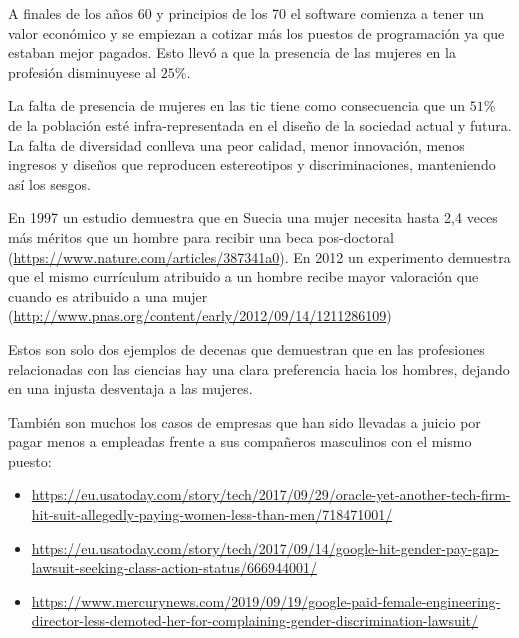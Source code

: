 A finales de los años 60 y principios de los 70 el software comienza a tener un valor económico y se empiezan a cotizar más los puestos de programación ya que estaban mejor pagados. Esto llevó a que la presencia de las mujeres en la profesión disminuyese al $25\%$.

La falta de presencia de mujeres en las \gls{tic}  tiene como consecuencia que un $51\%$ de la población esté infra-representada en el diseño de la sociedad actual y futura. La falta de diversidad conlleva una peor calidad, menor innovación, menos ingresos y diseños que reproducen estereotipos y discriminaciones, manteniendo así los sesgos.

En 1997 un estudio demuestra que en Suecia una mujer necesita hasta 2,4 veces más méritos que un hombre para recibir una beca pos-doctoral (\url{https://www.nature.com/articles/387341a0}). En 2012 un experimento demuestra que el mismo currículum atribuido a un hombre recibe mayor valoración que cuando es atribuido a una mujer  (\url{http://www.pnas.org/content/early/2012/09/14/1211286109})

Estos son solo dos ejemplos de decenas que demuestran que en las profesiones relacionadas con las ciencias hay una clara preferencia hacia los hombres, dejando en una injusta desventaja a las mujeres.

También son muchos los casos de empresas que han sido llevadas a juicio por pagar menos a empleadas frente a sus compañeros masculinos con el mismo puesto:
\begin{itemize}
    \item \url{https://eu.usatoday.com/story/tech/2017/09/29/oracle-yet-another-tech-firm-hit-suit-allegedly-paying-women-less-than-men/718471001/}
    \item \url{https://eu.usatoday.com/story/tech/2017/09/14/google-hit-gender-pay-gap-lawsuit-seeking-class-action-status/666944001/}
    \item \url{https://www.mercurynews.com/2019/09/19/google-paid-female-engineering-director-less-demoted-her-for-complaining-gender-discrimination-lawsuit/}
\end{itemize}
